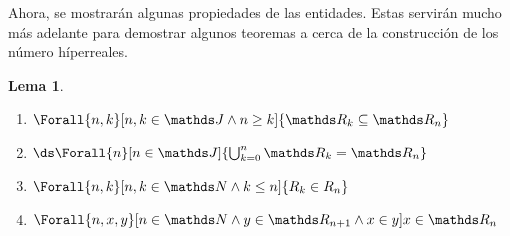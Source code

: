 \documentclass{article}
\theoremstyle{definition}
\theoremstyle{theorem*}
\newtheorem{lemma*}{Lema}[section]
\begin{document}
Ahora, se mostrarán algunas propiedades de las entidades. Estas servirán
mucho más adelante para demostrar algunos teoremas a cerca de la construcción
de los número híperreales.
\begin{lemma*}~
  \vspace{-20pt}
  \begin{enumerate}
    \item $\Forall{n,k}[n,k \in \J \land n \geq k]{\R_k \subseteq \R_n}$
    \item $\ds\Forall{n}[n\in\J]{\bigcup_{k=0}^n \R_k = \R_n}$
    \item $\Forall{n,k}[n,k \in\N\land k \leq n]{R_k \in R_n}$
    \item $\Forall{n,x,y}[n\in\N \land y\in\R_{n+1} \land x\in y]{x \in \R_n}$
  \end{enumerate}
\end{lemma*}
\end{document}
